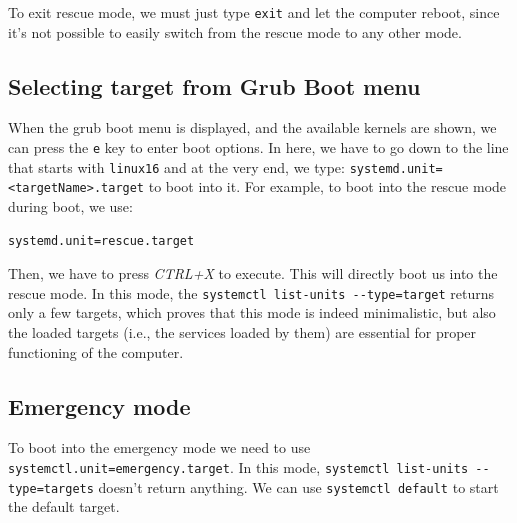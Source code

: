 \noindent
To exit rescue mode, we must just type \verb|exit| and let the computer reboot, since it's not possible to easily switch from the rescue mode to any other mode. 

\subsection{Selecting target from Grub Boot menu}
When the grub boot menu is displayed, and the available kernels are shown, we can press the \verb|e| key to enter boot options. In here, we have to go down to the line that starts with \verb|linux16| and at the very end, we type: \verb|systemd.unit=<targetName>.target| to boot into it. For example, to boot into the rescue mode during boot, we use:

\vspace{-15pt}
\begin{verbatim}
systemd.unit=rescue.target
\end{verbatim}
\vspace{-10pt}

\noindent
Then, we have to press \textit{CTRL+X} to execute. This will directly boot us into the rescue mode. In this mode, the \verb|systemctl list-units --type=target| returns only a few targets, which proves that this mode is indeed minimalistic, but also the loaded targets (i.e., the services loaded by them) are essential for proper functioning of the computer. 

\subsection{Emergency mode}
To boot into the emergency mode we need to use \verb|systemctl.unit=emergency.target|. In this mode, \verb|systemctl list-units --type=targets| doesn't return anything. We can use \verb|systemctl default| to start the default target. 

